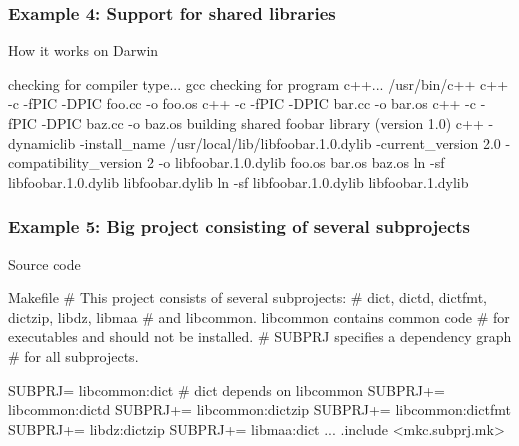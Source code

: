 \documentclass[hyperref={colorlinks=true}]{beamer}
\begin{document}
\begin{frame}[fragile]
  \frametitle{Example 4: Support for shared libraries}

  \begin{block}{How it works on Darwin}
\begin{CodeNoLabel}
checking for compiler type... gcc
checking for program c++... /usr/bin/c++
c++    -c -fPIC -DPIC foo.cc -o foo.os
c++    -c -fPIC -DPIC bar.cc -o bar.os
c++    -c -fPIC -DPIC baz.cc -o baz.os
building shared foobar library (version 1.0)
c++ -dynamiclib -install_name 
   /usr/local/lib/libfoobar.1.0.dylib 
   -current_version 2.0 -compatibility_version 2 
   -o libfoobar.1.0.dylib  foo.os bar.os baz.os
ln -sf libfoobar.1.0.dylib libfoobar.dylib
ln -sf libfoobar.1.0.dylib libfoobar.1.dylib
\prompt{\$}
\end{CodeNoLabel}
  \end{block}
\end{frame}

\begin{frame}[fragile]
  \frametitle{Example 5: Big project consisting of several subprojects}

  \begin{block}{Source code}
  \begin{Code}{Makefile}
# This project consists of several subprojects:
# dict, dictd, dictfmt, dictzip, libdz, libmaa
# and libcommon. libcommon contains common code
# for executables and should not be installed.
# SUBPRJ specifies a dependency graph
# for all subprojects.

SUBPRJ=   libcommon:dict   # dict depends on libcommon
SUBPRJ+=  libcommon:dictd
SUBPRJ+=  libcommon:dictzip
SUBPRJ+=  libcommon:dictfmt
SUBPRJ+=  libdz:dictzip
SUBPRJ+=  libmaa:dict
...
.include <mkc.subprj.mk>
  \end{Code}
  \end{block}
\end{frame}
\end{document}
